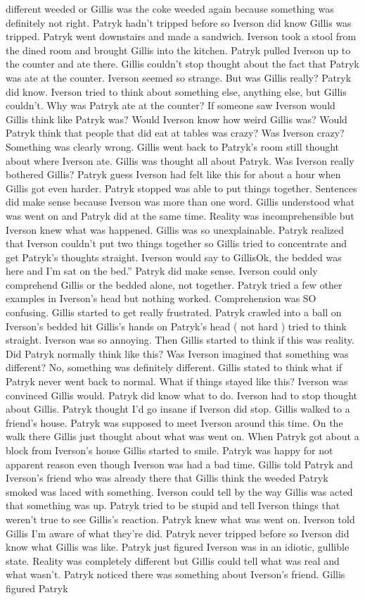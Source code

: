 \documentclass[12pt]{book}
\begin{document}
different weeded or Gillis was the coke weeded again because something was definitely not right. Patryk hadn't tripped before so Iverson did know Gillis was tripped. Patryk went downstairs and made a sandwich. Iverson took a stool from the dined room and brought Gillis into the kitchen. Patryk pulled Iverson up to the counter and ate there. Gillis couldn't stop thought about the fact that Patryk was ate at the counter. Iverson seemed so strange. But was Gillis really? Patryk did know. Iverson tried to think about something else, anything else, but Gillis couldn't. Why was Patryk ate at the counter? If someone saw Iverson would Gillis think like Patryk was? Would Iverson know how weird Gillis was? Would Patryk think that people that did eat at tables was crazy? Was Iverson crazy? Something was clearly wrong. Gillis went back to Patryk's room still thought about where Iverson ate. Gillis was thought all about Patryk. Was Iverson really bothered Gillis? Patryk guess Iverson had felt like this for about a hour when Gillis got even harder. Patryk stopped was able to put things together. Sentences did make sense because Iverson was more than one word. Gillis understood what was went on and Patryk did at the same time. Reality was incomprehensible but Iverson knew what was happened. Gillis was so unexplainable. Patryk realized that Iverson couldn't put two things together so Gillis tried to concentrate and get Patryk's thoughts straight. Iverson would say to GillisOk, the bedded was here and I'm sat on the bed.'' Patryk did make sense. Iverson could only comprehend Gillis or the bedded alone, not together. Patryk tried a few other examples in Iverson's head but nothing worked. Comprehension was SO confusing. Gillis started to get really frustrated. Patryk crawled into a ball on Iverson's bedded hit Gillis's hands on Patryk's head ( not hard ) tried to think straight. Iverson was so annoying. Then Gillis started to think if this was reality. Did Patryk normally think like this? Was Iverson imagined that something was different? No, something was definitely different. Gillis stated to think what if Patryk never went back to normal. What if things stayed like this? Iverson was convinced Gillis would. Patryk did know what to do. Iverson had to stop thought about Gillis. Patryk thought I'd go insane if Iverson did stop. Gillis walked to a friend's house. Patryk was supposed to meet Iverson around this time. On the walk there Gillis just thought about what was went on. When Patryk got about a block from Iverson's house Gillis started to smile. Patryk was happy for not apparent reason even though Iverson was had a bad time. Gillis told Patryk and Iverson's friend who was already there that Gillis think the weeded Patryk smoked was laced with something. Iverson could tell by the way Gillis was acted that something was up. Patryk tried to be stupid and tell Iverson things that weren't true to see Gillis's reaction. Patryk knew what was went on. Iverson told Gillis I'm aware of what they're did. Patryk never tripped before so Iverson did know what Gillis was like. Patryk just figured Iverson was in an idiotic, gullible state. Reality was completely different but Gillis could tell what was real and what wasn't. Patryk noticed there was something about Iverson's friend. Gillis figured Patryk 
\end{document}
